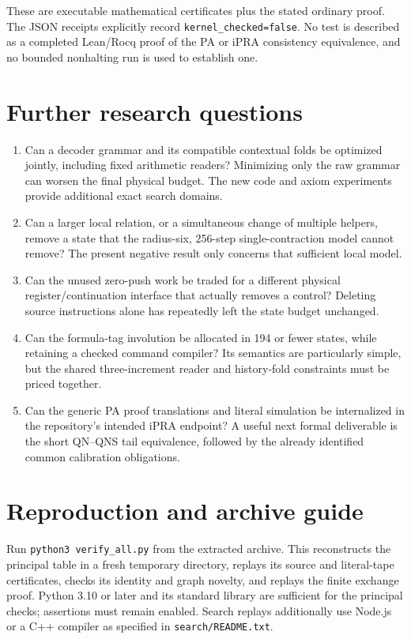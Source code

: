 \documentclass[11pt,letterpaper]{article}
\newcommand{\file}[1]{\nolinkurl{#1}}
\begin{document}
These are executable mathematical certificates plus the stated ordinary
proof. The JSON receipts explicitly record \file{kernel_checked=false}.
No test is described as a completed Lean/Rocq proof of the PA or iPRA
consistency equivalence, and no bounded nonhalting run is used to establish
one.



\section{Further research questions}

\begin{enumerate}
\item Can a decoder grammar and its compatible contextual folds be
optimized jointly, including fixed arithmetic readers? Minimizing only the
raw grammar can worsen the final physical budget. The new code and axiom
experiments provide additional exact search domains.
\item Can a larger local relation, or a simultaneous change of multiple
helpers, remove a state that the radius-six, 256-step single-contraction
model cannot remove? The present negative result only concerns that
sufficient local model.
\item Can the unused zero-push work be traded for a different physical
register/continuation interface that actually removes a control? Deleting
source instructions alone has repeatedly left the state budget unchanged.
\item Can the formula-tag involution be allocated in 194 or fewer states,
while retaining a checked command compiler? Its semantics are particularly
simple, but the shared three-increment reader and history-fold constraints
must be priced together.
\item Can the generic PA proof translations and literal simulation be
internalized in the repository's intended iPRA endpoint? A useful next
formal deliverable is the short QN--QNS tail equivalence, followed by the
already identified common calibration obligations.
\end{enumerate}

\section{Reproduction and archive guide}

Run \file{python3 verify_all.py} from the extracted archive. This reconstructs
the principal table in a fresh temporary directory, replays its source and
literal-tape certificates, checks its identity and graph novelty, and
replays the finite exchange proof. Python 3.10 or later and its standard
library are sufficient for the principal checks; assertions must remain
enabled. Search replays additionally use Node.js or a C++ compiler as
specified in \file{search/README.txt}.
\end{document}
